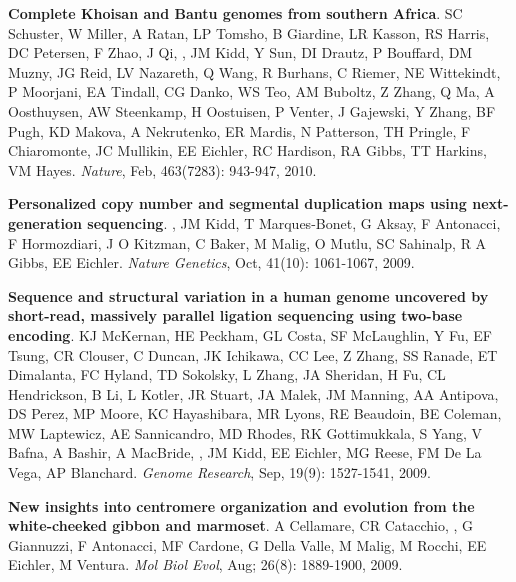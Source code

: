 \vspace{-.2cm}
    {\bf Complete Khoisan and Bantu genomes from southern Africa}.
    SC Schuster, W Miller, A Ratan, LP Tomsho, B Giardine, LR Kasson, RS
    Harris, DC Petersen, F Zhao, J Qi, \calkan{}, JM Kidd, Y Sun, DI Drautz, 
    P Bouffard, DM Muzny, JG Reid, LV Nazareth, Q Wang, R Burhans, C Riemer, 
    NE Wittekindt, P Moorjani, EA Tindall, CG Danko, WS Teo, AM Buboltz, 
    Z Zhang, Q Ma, A Oosthuysen, AW Steenkamp, H Oostuisen, P Venter, J 
    Gajewski, Y Zhang, BF Pugh, KD Makova, A Nekrutenko, ER Mardis, N Patterson, 
    TH Pringle, F Chiaromonte, JC Mullikin, EE Eichler, RC Hardison, RA Gibbs, TT 
    Harkins, VM Hayes. 
    {\em Nature}, Feb, 463(7283): 943-947, 2010.
    
\vspace{-.2cm}
    {\bf Personalized copy number and segmental duplication maps using next-generation sequencing}.
    \calkan{}, JM Kidd, T Marques-Bonet, G Aksay, F Antonacci, F Hormozdiari, J O Kitzman, 
    C Baker, M Malig, O Mutlu, SC Sahinalp, R A Gibbs, EE Eichler.  
    {\em Nature Genetics},  Oct, 41(10): 1061-1067, 2009.\\
    
\vspace{-.2cm}
    {\bf Sequence and structural variation in a human genome uncovered by short-read, massively parallel ligation sequencing using two-base encoding}.
    KJ McKernan, HE Peckham, GL Costa, SF McLaughlin, Y Fu, EF Tsung, CR Clouser, C Duncan, JK Ichikawa, CC Lee, Z Zhang, 
    SS Ranade, ET Dimalanta,  FC Hyland, TD Sokolsky, L Zhang, JA Sheridan, H Fu, CL Hendrickson, B Li, L Kotler, JR Stuart, 
    JA Malek, JM Manning, AA Antipova, DS Perez, MP Moore, KC Hayashibara, MR Lyons, RE Beaudoin, BE Coleman, MW Laptewicz, 
    AE Sannicandro, MD Rhodes, RK Gottimukkala, S Yang, V Bafna, A Bashir, A MacBride, \calkan{}, JM Kidd, EE Eichler, 
    MG Reese, FM De La Vega, AP Blanchard. 
    {\em Genome Research}, Sep, 19(9): 1527-1541, 2009.  

\vspace{-.2cm}
    {\bf  New insights into centromere organization and evolution from the white-cheeked gibbon and marmoset}.
    A Cellamare,    CR Catacchio,  \calkan{}, G Giannuzzi, F Antonacci, MF Cardone, G Della Valle, M Malig, M Rocchi, EE Eichler, M Ventura.
    {\em Mol Biol Evol}, Aug; 26(8): 1889-1900, 2009.
    
